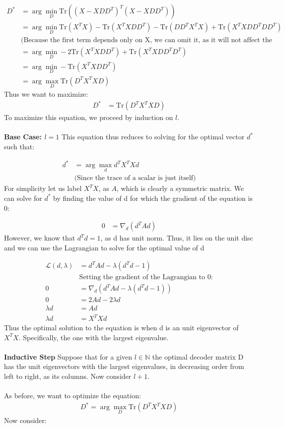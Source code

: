 \documentclass[12pt]{article}
\begin{document}
\begin{align*}
    D^* &= \displaystyle \arg \min_D \text{Tr}((X - XDD^T)^T(X- XDD^T)) \\
        &= \displaystyle \arg \min_D \text{Tr}(X^TX) - \text{Tr}(X^TXDD^T) - \text{Tr}(DD^TX^TX) + \text{Tr}(X^TXDD^TDD^T) \\
        & \text{(Because the first term depends only on X, we can omit it, as it will not affect the optimal D value)} \\
        &= \arg \min_D -2\text{Tr}(X^TXDD^T) + \text{Tr}(X^TXDD^TD^T) \\
        &= \arg \min_D -\text{Tr}(X^TXDD^T) \\
        &= \arg \max_D \text{Tr}(D^TX^TXD)
\end{align*}
Thus we want to maximize:
\begin{align*}
    D^* &= \text{Tr}(D^TX^TXD)
\end{align*}
To maximize this equation, we proceed by induction on $l$.
\\ \\
\textbf{Base Case: $l = 1$}
This equation thus reduces to solving for the optimal vector $d^*$ such that:

\begin{align*}
    d^* &= \arg \max_d d^TX^TXd \\
    & \text{(Since the trace of a scalar is just itself)}
\end{align*}
For simplicity let us label $X^TX$, as $A$, which is clearly a symmetric matrix.
We can solve for $d^*$ by finding the value of d for which the gradient of the equation is 0:

\begin{align*}
    0 &= \nabla_d(d^TAd)
\end{align*}
However, we know that $d^Td = 1$, as d has unit norm. Thus, it lies on the unit disc and we can use the Lagrangian to solve for the optimal value of d

\begin{align*}
    \mathcal{L}(d, \lambda) &= d^TAd - \lambda(d^Td - 1) \\
    & \text{Setting the gradient of the Lagrangian to 0:} \\
    0 &= \nabla_d(d^TAd - \lambda(d^Td - 1)) \\
    0 &= 2Ad - 2\lambda d \\
    \lambda d &= Ad \\
    \lambda d &= X^TXd
\end{align*}
Thus the optimal solution to the equation is when d is an unit eigenvector of $X^TX$. Specifically, the one with the largest eigenvalue.
\\ \\
\textbf{Inductive Step} Suppose that for a given $l \in \mathbb{N}$ the optimal decoder matrix D has the unit eigenvectors with the largest eigenvalues, in decreasing order from left to right, as its columns. Now consider $l + 1$.
\\ \\
As before, we want to optimize the equation:
\begin{align*}
    D^* = \arg \max_D \text{Tr}(D^TX^TXD)
\end{align*}
Now consider:
\end{document}
